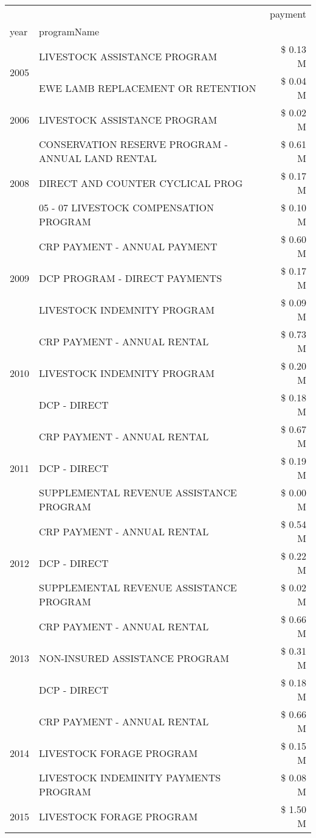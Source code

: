 \begin{tabular}{llr}
\toprule
 &  & payment \\
year & programName &  \\
\midrule
\multirow[t]{2}{*}{2005} & LIVESTOCK ASSISTANCE PROGRAM & \$ 0.13 M \\
 & EWE LAMB REPLACEMENT OR RETENTION & \$ 0.04 M \\
\cline{1-3}
2006 & LIVESTOCK ASSISTANCE PROGRAM & \$ 0.02 M \\
\cline{1-3}
\multirow[t]{3}{*}{2008} & CONSERVATION RESERVE PROGRAM - ANNUAL LAND RENTAL & \$ 0.61 M \\
 & DIRECT AND COUNTER CYCLICAL PROG & \$ 0.17 M \\
 & 05 - 07 LIVESTOCK COMPENSATION PROGRAM & \$ 0.10 M \\
\cline{1-3}
\multirow[t]{3}{*}{2009} & CRP PAYMENT - ANNUAL PAYMENT & \$ 0.60 M \\
 & DCP PROGRAM - DIRECT PAYMENTS & \$ 0.17 M \\
 & LIVESTOCK INDEMNITY PROGRAM & \$ 0.09 M \\
\cline{1-3}
\multirow[t]{3}{*}{2010} & CRP PAYMENT - ANNUAL RENTAL & \$ 0.73 M \\
 & LIVESTOCK INDEMNITY PROGRAM & \$ 0.20 M \\
 & DCP - DIRECT & \$ 0.18 M \\
\cline{1-3}
\multirow[t]{3}{*}{2011} & CRP PAYMENT - ANNUAL RENTAL & \$ 0.67 M \\
 & DCP - DIRECT & \$ 0.19 M \\
 & SUPPLEMENTAL REVENUE ASSISTANCE PROGRAM & \$ 0.00 M \\
\cline{1-3}
\multirow[t]{3}{*}{2012} & CRP PAYMENT - ANNUAL RENTAL & \$ 0.54 M \\
 & DCP - DIRECT & \$ 0.22 M \\
 & SUPPLEMENTAL REVENUE ASSISTANCE PROGRAM & \$ 0.02 M \\
\cline{1-3}
\multirow[t]{3}{*}{2013} & CRP PAYMENT - ANNUAL RENTAL & \$ 0.66 M \\
 & NON-INSURED ASSISTANCE PROGRAM & \$ 0.31 M \\
 & DCP - DIRECT & \$ 0.18 M \\
\cline{1-3}
\multirow[t]{3}{*}{2014} & CRP PAYMENT - ANNUAL RENTAL & \$ 0.66 M \\
 & LIVESTOCK FORAGE PROGRAM & \$ 0.15 M \\
 & LIVESTOCK INDEMINITY PAYMENTS PROGRAM & \$ 0.08 M \\
\cline{1-3}
\multirow[t]{3}{*}{2015} & LIVESTOCK FORAGE PROGRAM & \$ 1.50 M \\

\end{tabular}
